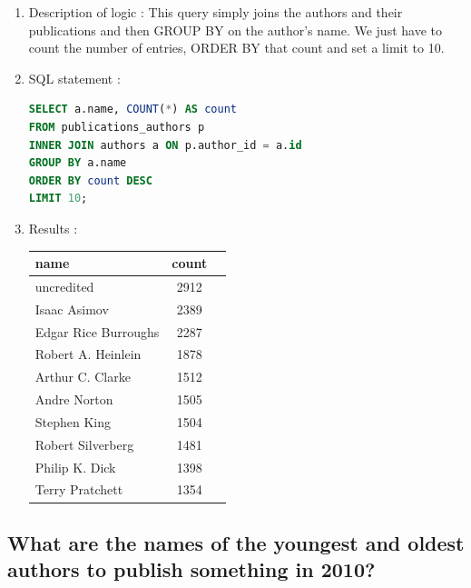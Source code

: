 \documentclass[doubleside, titlepage]{article}
\begin{document}
		\begin{enumerate}
	\item Description of logic : This query simply joins the authors and their publications and then GROUP BY on the author’s name. We just have to count the number of entries, ORDER BY that count and set a limit to 10.
	\item SQL statement :
		\begin{lstlisting}[language=SQL,showspaces=false,basicstyle=\ttfamily,numberstyle=\tiny,commentstyle=\color{gray}]
SELECT a.name, COUNT(*) AS count
FROM publications_authors p
INNER JOIN authors a ON p.author_id = a.id
GROUP BY a.name
ORDER BY count DESC
LIMIT 10;
		\end{lstlisting}

	\item Results :\\

	\begin{tabular}{|l|c|r|}
  \hline
  name & count \\
  \hline
uncredited & 2912\\
Isaac Asimov & 2389\\
Edgar Rice Burroughs & 2287\\
Robert A. Heinlein	& 1878\\
Arthur C. Clarke & 1512\\
Andre Norton & 1505\\
Stephen King & 1504\\
Robert Silverberg & 1481\\
Philip K. Dick & 1398\\
Terry Pratchett	& 1354\\
  \hline
\end{tabular}

	\end{enumerate}
\newpage

\subsection{What are the names of the youngest and oldest authors to publish something in 2010?}
\end{document}
